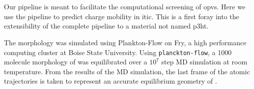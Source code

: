 \section{}

\label{itic}

Our pipeline is meant to facilitate the computational screening of \gls{opv}s.
Here we use the pipeline to predict charge mobility in \gls{itic}.
This is a first foray into the extensibility of the complete pipeline to a
material not named \gls{p3ht}. 

The  morphology was simulated using Plankton-Flow \cite{cmelab} on Fry,         
a high performance computing cluster at Boise State University.  
Using \texttt{planckton-flow}, a 1000
molecule morphology of  was equilibrated over a $10^{7}$ step MD simulation at room temperature. 
From the results of the MD simulation, the last frame of the atomic
trajectories is taken to represent an accurate equilibrium geometry
of . 

